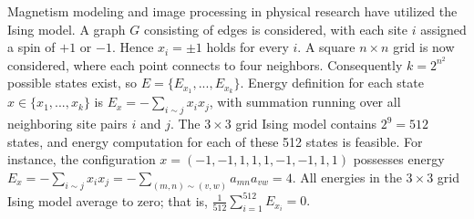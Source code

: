 \documentclass[twoside]{article}
\begin{document}
Magnetism modeling and image processing in physical research have utilized the Ising model. A graph $G$ consisting of edges is considered, with each site $i$ assigned a spin of $+1$ or $-1$. Hence ${{x}_{i}}=\pm 1$ holds for every $i$. A square $n\times n$ grid is now considered, where each point connects to four neighbors. Consequently $k={{2}^{{{n}^{2}}}}$ possible states exist, so $E=\{ E_{x_1},...,E_{x_k}\}$. Energy definition for each state $x \in \{ x_1,...,x_k\}$ is $E_x=-\sum\nolimits_{i\sim j} x_i x_j$, with summation running over all neighboring site pairs $i$ and $j$. The $3\times 3$ grid Ising model contains ${{2}^{9}}=512$ states, and energy computation for each of these 512 states is feasible. For instance, the configuration $x= \left(-1, -1, 1, 1, 1, -1, -1, 1, 1\right)$ possesses energy
$E_x = -\sum\nolimits_{i\sim j} x_i x_j = -\sum\nolimits_{(m,n)\sim (v,w)} a_{mn} a_{vw} = 4$.
All energies in the $3\times 3$ grid Ising model average to zero; that is, $\tfrac{1}{512}\sum\nolimits_{i=1}^{512}{{{E}_{{{x}_{i}}}}}=0.$
\end{document}
